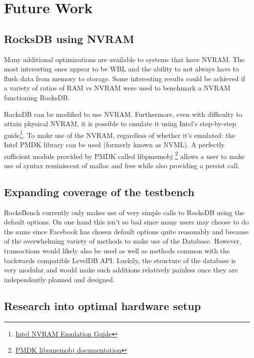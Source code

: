\documentclass[twocolumn,11pt]{article}
\begin{document}
\section{Future Work}
\label{sec:future_work}

\subsection{RocksDB using NVRAM}
\label{subsec:nvram}

Many additional optimizations are available to systems that have NVRAM. The most
interesting ones appear to be WBL and the ability to not always have to flush
data from memory to storage. Some interesting results could be achieved if a
variety of ratios of RAM vs NVRAM were used to benchmark a NVRAM functioning
RocksDB.

RocksDB can be modified to use NVRAM. Furthermore, even with difficulty to
attain physical NVRAM, it is possible to emulate it using Intel's step-by-step
guide\footnote{
  \href{https://software.intel.com/en-us/articles/how-to-emulate-persistent-memory-on-an-intel-architecture-server/}
  {Intel NVRAM Emulation Guide}}.
To make use of the NVRAM, regardless of whether it's emulated: the Intel PMDK
library can be used (formerly known as NVML). A perfectly sufficient module
provided by PMDK called libpmemobj
\footnote{\href{http://pmem.io/pmdk/libpmemobj/}
{PMDK libpmemobj documentation}} allows a user to make use of syntax reminiscent
of malloc and free while also providing a persist call.

\subsection{Expanding coverage of the testbench}

RocksBench currently only makes use of very simple calls to RocksDB using the
default options. On one hand this isn't so bad since many users may choose to do
the same since Facebook has chosen default options quite reasonably and because
of the overwhelming variety of methods to make use of the Database. However,
transactions would likely also be used as well as methods common with the
backwards compatible LevelDB API. Luckily, the structure of the database is very
modular and would make such additions relatively painless once they are
independently planned and designed.

\subsection{Research into optimal hardware setup}
\end{document}
